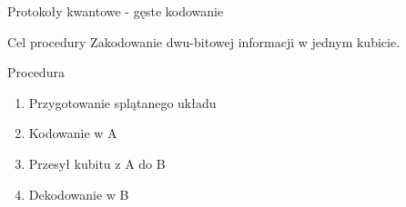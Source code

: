 \documentclass{beamer}
\begin{document}
	\begin{frame}{Protokoły kwantowe - gęste kodowanie}
		\begin{block}{Cel procedury}
			\vspace{0.5em}
			Zakodowanie dwu-bitowej informacji w jednym kubicie. 
			\vspace{0.5em}
		\end{block}
		\begin{block}{Procedura}
			\vspace{0.5em}
				\begin{enumerate}
					\item Przygotowanie splątanego układu
					\item Kodowanie w A
					\item Przesył kubitu z A do B
					\item Dekodowanie w B
				\end{enumerate}
			\vspace{0.5em}
		\end{block}
		
	\end{frame}
	
\end{document}
